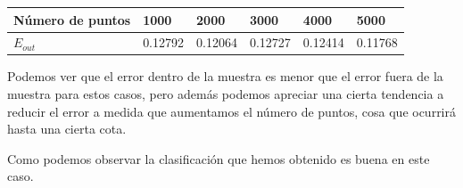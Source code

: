 \documentclass[12pt,a4paper]{article}
\begin{document}
\begin{table}[H]
	\centering
	\begin{tabular}{|l|l|l|l|l|l|}
		\hline
		Número de puntos & 1000                & 2000                & 3000              & 4000                & 5000                \\ \hline
		$E_{out}$       & 0.12792 & 0.12064 & 0.12727 & 0.12414 & 0.11768 \\ \hline
	\end{tabular}
\end{table}

Podemos ver que el error dentro de la muestra es menor que el error fuera de la muestra para estos casos, pero además podemos apreciar una cierta tendencia a reducir el error a medida que aumentamos el número de puntos, cosa que ocurrirá hasta una cierta cota.

Como podemos observar la clasificación que hemos obtenido es buena en este caso.
\end{document}
